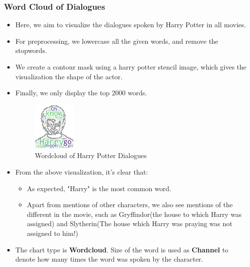 \documentclass[a4paper]{article}
\begin{document}
\subsubsection{Word Cloud of Dialogues}
\begin{itemize}
    \item Here, we aim to visualize the dialogues spoken by Harry Potter in all movies.
    \item For preprocessing, we lowercase all the given words, and remove the stopwords.
    \item We create a contour mask using a harry potter stencil image, which gives the visualization the shape of the actor.
    \item Finally, we only display the top 2000 words.
    \begin{figure}[H]
        \centering
        \includegraphics[width=0.2\textwidth]{wordcloud}
        \caption{Wordcloud of Harry Potter Dialogues}
        \label{fig:wordcloud}
    \end{figure}
    \item From the above visualization, it's clear that:
    \begin{itemize}
        \item As expected, "Harry" is the most common word.
        \item Apart from mentions of other characters, we also see mentions of the different in the movie, such as Gryffindor(the house to which Harry was assigned) and Slytherin(The house which Harry was praying was not assigned to him!)
    \end{itemize}
    \item The chart type is \textbf{Wordcloud}. Size of the word is used as \textbf{Channel} to denote how many times the word was spoken by the character.  
\end{itemize}
\end{document}
